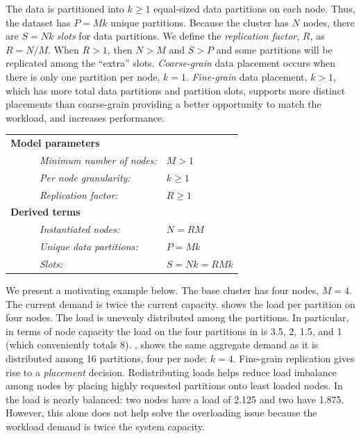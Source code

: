 The data is partitioned into $k \ge 1$ equal-sized data partitions on each node.
Thus, the dataset has $P = Mk$ unique partitions.
Because the cluster has $N$ nodes, there are $S = Nk$ \emph{slots} for
data partitions.
We define the \emph{replication factor}, $R$, as $R=N/M$.
When $R>1$, then $N>M$ and $S > P$ and some partitions will
be replicated among
the ``extra'' slots.
\emph{Coarse-grain} data placement occurs when there is only one
partition per node, $k=1$.
\emph{Fine-grain} data placement, $k>1$, which has more total
data partitions and partition slots, supports more distinct placements
than coarse-grain providing a better opportunity to match the
workload, and increases performance.

\medskip
\begin{tabular}[h]{lll}
  \multicolumn{3}{l}{\textbf{Model parameters}}\\
  ~~~~&\emph{Minimum number of nodes:} & $M>1$\\
  &\emph{Per node granularity:} & $k\ge 1$ \\
  &\emph{Replication factor:} & $R\ge 1$ \\
  \multicolumn{3}{l}{\textbf{Derived terms}}\\
  &\emph{Instantiated nodes:} & $N=RM$\\
  &\emph{Unique data partitions:} & $P = Mk$\\
  &\emph{Slots:} & $S = Nk = RMk$\\
\end{tabular}
\medskip

We present a motivating example below.
The base cluster has four nodes, $M=4$.
The current demand is twice the current capacity.
\myfigure{\ref{fig:dp_before_coarse}}
shows the load per partition on four nodes.
The load is unevenly distributed among the partitions.
In particular, in terms of node capacity the load on the four partitions in
\myfigure{\ref{fig:dp_before_coarse}} is 3.5, 2, 1.5, and 1 (which
conveniently totals 8).
\myfigure{\ref{fig:dp_before_fine}}, shows the same
aggregate demand as it is distributed among 16 partitions, four per
node: $k=4$.
Fine-grain replication gives rise to a \emph{placement} decision.
Redistributing loads helps reduce load imbalance among nodes
by placing highly requested partitions onto least loaded nodes.
In \myfigure{\ref{fig:dp_before_fine_placement}} the load is nearly
balanced: two nodes have a load of 2.125 and two have 1.875.
However, this alone does not help solve the overloading issue
because the workload demand is twice the system capacity.


